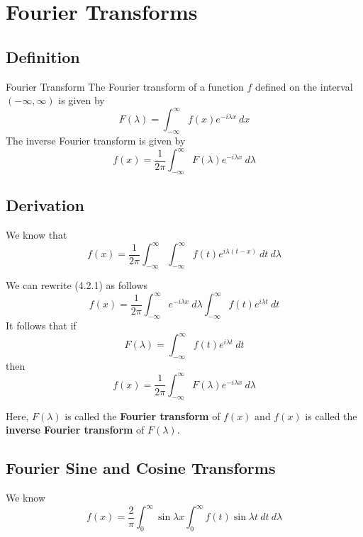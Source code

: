 \documentclass[12pt]{article}
\numberwithin{equation}{subsection}
\begin{document}

\section{Fourier Transforms}

\subsection{Definition}
\begin{definition}{Fourier Transform}{}
    The Fourier transform of a function $f$ defined on the interval $(-\infty,\infty)$ is given by
    \begin{equation}
        F(\lambda) = \int_{-\infty}^{\infty} {f(x) e^{-i\lambda x}} \: d{x}
    \end{equation}
    The inverse Fourier transform is given by
    \begin{equation}
        f(x) = \frac{1}{2\pi} \int_{-\infty}^{\infty} {F(\lambda) e^{-i\lambda x}} \: d{\lambda}
    \end{equation}
\end{definition}

\subsection{Derivation}
We know that
\begin{equation}
    f(x) = \frac{1}{2\pi} \int_{-\infty}^{\infty} { \int_{-\infty}^{\infty} { f(t) e^{i\lambda(t-x)} } \: d{t} } \: d{\lambda}
\end{equation}

We can rewrite (4.2.1) as follows \[
    f(x) = \frac{1}{2\pi} \int_{-\infty}^{\infty} {e^{-i\lambda x}} \: d{\lambda} \int_{-\infty}^{\infty} {f(t) e^{i\lambda t}} \: d{t}
\]
It follows that if
\begin{equation}
    \boxed{ F(\lambda) = \int_{-\infty}^{\infty} {f(t) e^{i\lambda t}} \: d{t} }
\end{equation}
then
\begin{equation}
    \boxed{ f(x) = \frac{1}{2\pi} \int_{-\infty}^{\infty} { F(\lambda) e^{-i\lambda x} } \: d{\lambda} }
\end{equation}

Here, $F(\lambda)$ is called the \textbf{Fourier transform} of $f(x)$ and $f(x)$ is called the \textbf{inverse Fourier transform} of $F(\lambda)$.

\subsection{Fourier Sine and Cosine Transforms}
We know
\begin{equation}
    f(x) = \frac{2}{\pi} \int_{0}^{\infty} { \sin{\lambda x} \int_{0}^{\infty} { f(t) \sin{\lambda t} } \: d{t} } \: d{\lambda}
\end{equation}
\end{document}
